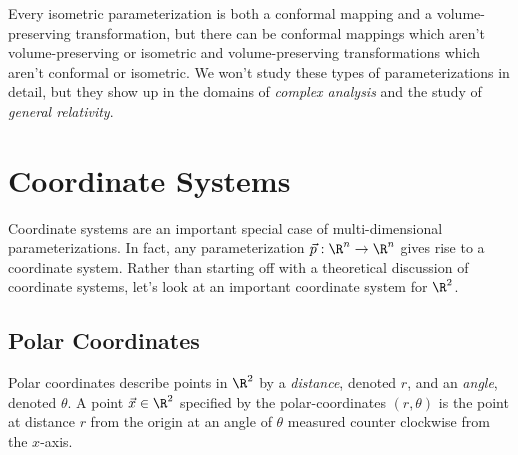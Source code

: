 Every isometric parameterization is both a conformal mapping and a volume-preserving transformation, but
there can be conformal mappings which aren't volume-preserving or isometric and volume-preserving transformations
which aren't conformal or isometric.  We won't study these types of parameterizations in detail, but
they show up in the domains of \emph{complex analysis} and the study of \emph{general relativity}.


\begin{exercises}
\end{exercises}

\section{Coordinate Systems}

Coordinate systems are an important special case of multi-dimensional parameterizations.
In fact, any parameterization $\vec p:\R^n\to\R^n$ gives rise to a coordinate system.  Rather than
starting off with a theoretical discussion of coordinate systems,
let's look at an
important coordinate system for $\R^2$.

\subsection{Polar Coordinates}
Polar coordinates describe points in $\R^2$ by a \emph{distance}, denoted $r$,
and an \emph{angle}, denoted $\theta$.  A point $\vec x\in\R^2$ specified by the polar-coordinates
$(r,\theta)$ is the point at distance $r$ from the origin at an angle of $\theta$
measured counter clockwise from the $x$-axis.

